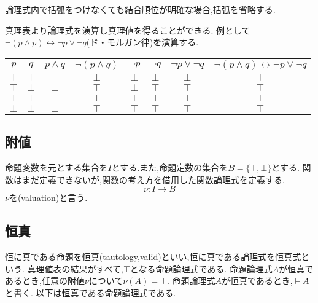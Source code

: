 論理式内で括弧をつけなくても結合順位が明確な場合,括弧を省略する.

真理表より論理式を演算し真理値を得ることができる.
例として
$\lnot (p \land p) \leftrightarrow  \lnot p \lor \lnot q$(ド・モルガン律)を演算する.
\begin{center}
 \begin{tabular}{|c c||c|c||c|c|c||c|}
  \hline
  $p$ & $q$ &
		  $p \land q$ & $\lnot (p \land q)$ &
				  $\lnot p$ & $\lnot q$ & $\lnot p \lor \lnot q$ &
							  $\lnot (p \land q) \leftrightarrow \lnot p \lor \lnot q$ \\
  \hhline{|==#=|=#=|=|=#=|}
  $\top$ & $\top$ & $\top$ & $\bot$ & $\bot$ & $\bot$ & $\bot$ & $\top$ \\
  \hline
  $\top$ & $\bot$ & $\bot$ & $\top$ & $\bot$ & $\top$ & $\top$ & $\top$ \\
  \hline
  $\bot$ & $\top$ & $\bot$ & $\top$ & $\top$ & $\bot$ & $\top$ & $\top$ \\
  \hline
  $\bot$ & $\bot$ & $\bot$ & $\top$ & $\top$ & $\top$ & $\top$ & $\top$ \\
  \hline
 \end{tabular}
\end{center}

\subsection{附値}
命題変数を元とする集合を$I$とする.また,命題定数の集合を$B=\{\top,\bot\}$とする.
関数はまだ定義できないが,関数の考え方を借用した関数論理式を定義する.
\begin{equation*}
 \nu:I \to B
\end{equation*}
$\nu$を(valuation)と言う.

\subsection{恒真}
恒に真である命題を恒真(tautology,valid)といい,恒に真である論理式を恒真式という.
真理値表の結果がすべて,$\top$となる命題論理式である.
命題論理式$A$が恒真であるとき,任意の附値$\nu$について$\nu(A)=\top$.
命題論理式$A$が恒真であるとき,$\models A$と書く.
以下は恒真である命題論理式である.

